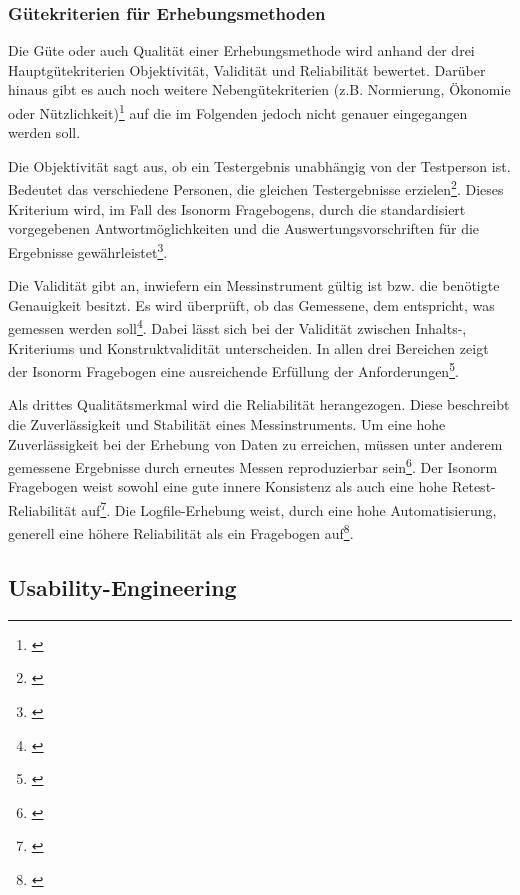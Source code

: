 
\subsubsection{Gütekriterien für Erhebungsmethoden}

Die Güte oder auch Qualität einer Erhebungsmethode wird anhand der drei Hauptgütekriterien Objektivität, Validität und Reliabilität bewertet. Darüber hinaus gibt es auch noch weitere Nebengütekriterien (z.B. Normierung, Ökonomie oder Nützlichkeit)\footnote{\cite[vgl.][Kap. 3.5]{Figl2010}} auf die im Folgenden jedoch nicht genauer eingegangen werden soll.

Die Objektivität sagt aus, ob ein Testergebnis unabhängig von der Testperson ist. Bedeutet das verschiedene Personen, die gleichen Testergebnisse erzielen\footnote{\cite[vgl.][Kap. 1]{Himme2007}}. Dieses Kriterium wird, im Fall des Isonorm Fragebogens, durch die standardisiert vorgegebenen Antwortmöglichkeiten und die Auswertungsvorschriften für die Ergebnisse gewährleistet\footnote{\cite[vgl.][Kap. 3.5.1]{Figl2010}}.

Die Validität gibt an, inwiefern ein Messinstrument gültig ist bzw. die benötigte Genauigkeit besitzt. Es wird überprüft, ob das Gemessene, dem entspricht, was gemessen werden soll\footnote{\cite[vgl][Kap. 1]{Himme2007}}. Dabei lässt sich bei der Validität zwischen Inhalts-, Kriteriums und Konstruktvalidität unterscheiden. In allen drei Bereichen zeigt der Isonorm Fragebogen eine ausreichende Erfüllung der Anforderungen\footnote{\cite[vgl.][Kap. 3.5.2]{Figl2010}}.

Als drittes Qualitätsmerkmal wird die Reliabilität herangezogen. Diese beschreibt die Zuverlässigkeit und Stabilität eines Messinstruments. Um eine hohe Zuverlässigkeit bei der Erhebung von Daten zu erreichen, müssen unter anderem gemessene Ergebnisse durch erneutes Messen reproduzierbar sein\footnote{\cite[vgl.][Kap. 1]{Himme2007}}. Der Isonorm Fragebogen weist sowohl eine gute innere Konsistenz als auch eine hohe Retest-Reliabilität auf\footnote{\cite[vgl.][Kap. 3.5.3]{Figl2010}}. Die Logfile-Erhebung weist, durch eine hohe Automatisierung, generell eine höhere Reliabilität als ein Fragebogen auf\footnote{\cite[vgl.][Kap. 65.3]{Baur2014}}.


\subsection{Usability-Engineering}
